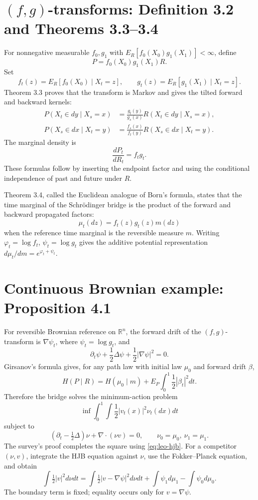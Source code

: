 \section{$(f,g)$-transforms: Definition 3.2 and Theorems 3.3--3.4}
For nonnegative measurable \(f_0,g_1\) with
\(E_R[f_0(X_0)g_1(X_1)]<\infty\), define
\[
 P=f_0(X_0)g_1(X_1)R.
\]
Set
\begin{equation}\label{eq:leo-ftgt}
 f_t(z)=E_R[f_0(X_0)\mid X_t=z],
 \qquad
 g_t(z)=E_R[g_1(X_1)\mid X_t=z].
\end{equation}
Theorem 3.3 proves that the transform is Markov and gives the tilted forward and backward kernels:
\begin{align}
 P(X_t\in dy\mid X_s=x)
 &=\frac{g_t(y)}{g_s(x)}R(X_t\in dy\mid X_s=x),\label{eq:leo-forward}\\
 P(X_s\in dx\mid X_t=y)
 &=\frac{f_s(x)}{f_t(y)}R(X_s\in dx\mid X_t=y).\label{eq:leo-backward}
\end{align}
The marginal density is
\begin{equation}\label{eq:leo-marginal}
 \frac{dP_t}{dR_t}=f_tg_t.
\end{equation}
These formulas follow by inserting the endpoint factor and using the conditional independence of
past and future under \(R\).

Theorem 3.4, called the Euclidean analogue of Born's formula, states that the time marginal of the
Schr\"odinger bridge is the product of the forward and backward propagated factors:
\[
 \mu_t(dz)=f_t(z)g_t(z)m(dz)
\]
when the reference time marginal is the reversible measure \(m\).  Writing
\(\varphi_t=\log f_t\), \(\psi_t=\log g_t\) gives the additive potential representation
\(d\mu_t/dm=e^{\varphi_t+\psi_t}\).

\section{Continuous Brownian example: Proposition 4.1}
For reversible Brownian reference on \(\mathbb R^n\), the forward drift of the
\((f,g)\)-transform is \(\nabla\psi_t\), where \(\psi_t=\log g_t\), and
\begin{equation}\label{eq:leo-hjb}
 \partial_t\psi+\frac12\Delta\psi+\frac12|\nabla\psi|^2=0.
\end{equation}
Girsanov's formula gives, for any path law with initial law \(\mu_0\) and forward drift \(\beta\),
\begin{equation}\label{eq:leo-energy}
 H(P\mid R)=H(\mu_0\mid m)+
 E_P\int_0^1\frac12|\beta_t|^2dt.
\end{equation}
Therefore the bridge solves the minimum-action problem
\[
 \inf\int_0^1\int\frac12|v_t(x)|^2\nu_t(dx)dt
\]
subject to
\[
 (\partial_t-\tfrac12\Delta)\nu+
 \nabla\cdot(\nu v)=0,
 \qquad \nu_0=\mu_0,\ \nu_1=\mu_1.
\]
The survey's proof completes the square using \eqref{eq:leo-hjb}.  For a competitor \((\nu,v)\),
integrate the HJB equation against \(\nu\), use the Fokker--Planck equation, and obtain
\[
 \int\tfrac12|v|^2d\nu dt
 =\int\tfrac12|v-\nabla\psi|^2d\nu dt+
   \int\psi_1d\mu_1-\int\psi_0d\mu_0.
\]
The boundary term is fixed; equality occurs only for \(v=\nabla\psi\).

